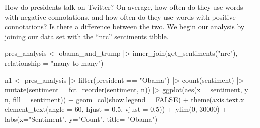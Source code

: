 \documentclass[
  letterpaper,
  DIV=11,
  numbers=noendperiod]{scrartcl}
\newenvironment{Shaded}{\begin{snugshade}}{\end{snugshade}}
\newcommand{\AttributeTok}[1]{\textcolor[rgb]{0.40,0.45,0.13}{#1}}
\newcommand{\ConstantTok}[1]{\textcolor[rgb]{0.56,0.35,0.01}{#1}}
\newcommand{\DecValTok}[1]{\textcolor[rgb]{0.68,0.00,0.00}{#1}}
\newcommand{\FloatTok}[1]{\textcolor[rgb]{0.68,0.00,0.00}{#1}}
\newcommand{\FunctionTok}[1]{\textcolor[rgb]{0.28,0.35,0.67}{#1}}
\newcommand{\NormalTok}[1]{\textcolor[rgb]{0.00,0.23,0.31}{#1}}
\newcommand{\OtherTok}[1]{\textcolor[rgb]{0.00,0.23,0.31}{#1}}
\newcommand{\SpecialCharTok}[1]{\textcolor[rgb]{0.37,0.37,0.37}{#1}}
\newcommand{\StringTok}[1]{\textcolor[rgb]{0.13,0.47,0.30}{#1}}
\begin{document}
How do presidents talk on Twitter? On average, how often do they use
words with negative connotations, and how often do they use words with
positive connotations? Is there a difference between the two. We begin
our analysis by joining our data set with the ``nrc'' sentiments tibble.

\begin{Shaded}
\begin{Highlighting}[]
\NormalTok{pres\_analysis }\OtherTok{\textless{}{-}}\NormalTok{ obama\_and\_trump }\SpecialCharTok{|\textgreater{}} 
  \FunctionTok{inner\_join}\NormalTok{(}\FunctionTok{get\_sentiments}\NormalTok{(}\StringTok{"nrc"}\NormalTok{), }\AttributeTok{relationship =} \StringTok{"many{-}to{-}many"}\NormalTok{)}

\NormalTok{n1 }\OtherTok{\textless{}{-}}\NormalTok{ pres\_analysis }\SpecialCharTok{|\textgreater{}}
  \FunctionTok{filter}\NormalTok{(president }\SpecialCharTok{==} \StringTok{"Obama"}\NormalTok{) }\SpecialCharTok{|\textgreater{}}
  \FunctionTok{count}\NormalTok{(sentiment) }\SpecialCharTok{|\textgreater{}} 
  \FunctionTok{mutate}\NormalTok{(}\AttributeTok{sentiment =} \FunctionTok{fct\_reorder}\NormalTok{(sentiment, n)) }\SpecialCharTok{|\textgreater{}} 
  \FunctionTok{ggplot}\NormalTok{(}\FunctionTok{aes}\NormalTok{(}\AttributeTok{x =}\NormalTok{ sentiment, }\AttributeTok{y =}\NormalTok{ n, }\AttributeTok{fill =}\NormalTok{ sentiment)) }\SpecialCharTok{+}
  \FunctionTok{geom\_col}\NormalTok{(}\AttributeTok{show.legend =}  \ConstantTok{FALSE}\NormalTok{) }\SpecialCharTok{+} 
  \FunctionTok{theme}\NormalTok{(}\AttributeTok{axis.text.x =} \FunctionTok{element\_text}\NormalTok{(}\AttributeTok{angle =} \DecValTok{60}\NormalTok{, }\AttributeTok{hjust =} \FloatTok{0.5}\NormalTok{, }\AttributeTok{vjust =} \FloatTok{0.5}\NormalTok{)) }\SpecialCharTok{+} 
  \FunctionTok{ylim}\NormalTok{(}\DecValTok{0}\NormalTok{, }\DecValTok{30000}\NormalTok{) }\SpecialCharTok{+} 
  \FunctionTok{labs}\NormalTok{(}\AttributeTok{x=}\StringTok{"Sentiment"}\NormalTok{, }\AttributeTok{y=}\StringTok{"Count"}\NormalTok{, }\AttributeTok{title=} \StringTok{"Obama"}\NormalTok{)}



\end{Highlighting}
\end{Shaded}
\end{document}
